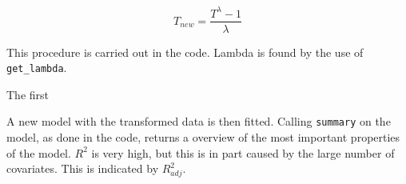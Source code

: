 \begin{equation}
T_{new} = \frac{T^{\lambda} - 1}{\lambda}
\end{equation}

This procedure is carried out in the code. Lambda is found by the use of \texttt{get_lambda}.

The first

A new model with the transformed data is then fitted. Calling \texttt{summary} on the model, as done in the code, returns a overview of the most important properties of the model. $R^2$ is very high, but this is in part caused by the large number of covariates. This is indicated by $R^2_{adj}$. 



